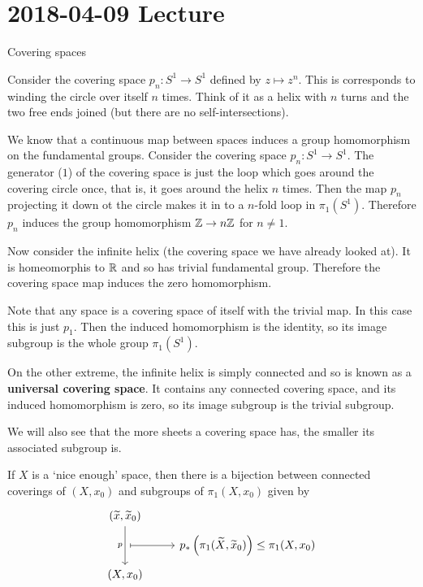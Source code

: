 \section*{2018-04-09 Lecture}

Covering spaces

Consider the covering space $p_n: S^1 \to S^1$ defined by $z \mapsto z^n$.
This is corresponds to winding the circle over itself $n$ times.
Think of it as a helix with $n$ turns and the two free ends joined (but there are no self-intersections).

We know that a continuous map between spaces induces a group homomorphism on the fundamental groups.
Consider the covering space $p_n: S^1 \to S^1$.
The generator ($1$) of the covering space is just the loop which goes around the covering circle once, that is, it goes around the helix $n$ times.
Then the map $p_n$ projecting it down ot the circle makes it in to a $n$-fold loop in $\pi_1(S^1)$.
Therefore $p_n$ induces the group homomorphism $\mathbb{Z} \to n\mathbb{Z}$ for $n \neq 1$.

Now consider the infinite helix (the covering space we have already looked at).
It is homeomorphis to $\mathbb{R}$ and so has trivial fundamental group.
Therefore the covering space map induces the zero homomorphism.

Note that any space is a covering space of itself with the trivial map.
In this case this is just $p_1$.
Then the induced homomorphism is the identity, so its image subgroup is the whole group $\pi_1(S^1)$.

On the other extreme, the infinite helix is simply connected and so is known as a \textbf{universal covering space}.
It contains any connected covering space, and its induced homomorphism is zero, so its image subgroup is the trivial subgroup.

We will also see that the more sheets a covering space has, the smaller its associated subgroup is.

\begin{thm}
	If $X$ is a `nice enough' space, then there is a bijection between connected coverings of $(X,x_0)$ and subgroups of $\pi_1(X,x_0)$ given by
	\[\begin{tikzcd}[row sep=tiny]
		(\wt{x},\wt{x}_0) \ar[dd, swap, "p"] & \\
		\ar[r, mapsto] & p_*\left(\pi_1(\wt X,\wt x_0)\right) \leq \pi_1(X,x_0) \\
		(X,x_0) &
	\end{tikzcd}\]
\end{thm}

